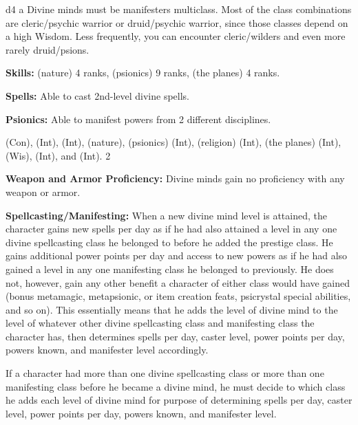 {d4}
{a}
{Divine minds must be manifesters multiclass. Most of the class combinations are cleric/psychic warrior or druid/psychic warrior, since those classes depend on a high Wisdom. Less frequently, you can encounter cleric/wilders and even more rarely druid/psions.}
{
\textbf{Skills:}  (nature) 4 ranks,  (psionics) 9 ranks,  (the planes) 4 ranks.

\textbf{Spells:} Able to cast 2nd-level divine spells.

\textbf{Psionics:} Able to manifest powers from 2 different disciplines.
}
{
 (Con),  (Int),  (Int),  (nature),  (psionics) (Int),  (religion) (Int),  (the planes) (Int),  (Wis),  (Int), and  (Int).
}
{2}
{}{}
{
\textbf{Weapon and Armor Proficiency:} Divine minds gain no proficiency with any weapon or armor.

\textbf{Spellcasting/Manifesting:} When a new divine mind level is attained, the character gains new spells per day as if he had also attained a level in any one divine spellcasting class he belonged to before he added the prestige class. He gains additional power points per day and access to new powers as if he had also gained a level in any one manifesting class he belonged to previously. He does not, however, gain any other benefit a character of either class would have gained (bonus metamagic, metapsionic, or item creation feats, psicrystal special abilities, and so on). This essentially means that he adds the level of divine mind to the level of whatever other divine spellcasting class and manifesting class the character has, then determines spells per day, caster level, power points per day, powers known, and manifester level accordingly.

If a character had more than one divine spellcasting class or more than one manifesting class before he became a divine mind, he must decide to which class he adds each level of divine mind for purpose of determining spells per day, caster level, power points per day, powers known, and manifester level.
}
